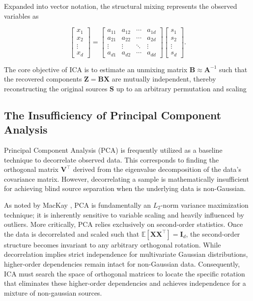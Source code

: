 \documentclass[12pt,a4paper,twoside,openany]{book}
\begin{document}
Expanded into vector notation, the structural mixing represents the observed variables as

\begin{equation}
    \begin{bmatrix}
    x_1 \\
    x_2 \\
    \vdots \\
    x_d
    \end{bmatrix}
    = 
    \begin{bmatrix}
    a_{11} & a_{12} & \cdots & a_{1d} \\
    a_{21} & a_{22} & \cdots & a_{2d} \\
    \vdots & \vdots & \ddots & \vdots \\
    a_{d1} & a_{d2} & \cdots & a_{dd}
    \end{bmatrix}
    \begin{bmatrix}
    s_1 \\
    s_2 \\
    \vdots \\
    s_d
    \end{bmatrix}.
\end{equation}

The core objective of ICA is to estimate an unmixing matrix $\mathbf{B} \approx \mathbf{A}^{-1}$ such that the recovered components $\mathbf{Z} = \mathbf{B}\mathbf{X}$ 
are mutually independent, thereby reconstructing the original sources $\mathbf{S}$ up to an arbitrary permutation and scaling

\subsection{The Insufficiency of Principal Component Analysis}

Principal Component Analysis (PCA) is frequently utilized as a baseline technique to decorrelate observed data. 
This corresponds to finding the orthogonal matrix $\mathbf{V}^\top$ derived from the eigenvalue decomposition of 
the data's covariance matrix. However, decorrelating a sample is mathematically insufficient for 
achieving blind source separation when the underlying data is non-Gaussian. 

As noted by MacKay \citeyear{mackay2003}, PCA is fundamentally an $L_2$-norm variance maximization technique; 
it is inherently sensitive to variable scaling and heavily influenced by outliers. More critically, 
PCA relies exclusively on second-order statistics. Once the data is decorrelated and scaled such that $\mathbb{E}[\mathbf{X}\mathbf{X}^\top] = \mathbf{I}_d$, 
the second-order structure becomes invariant to any arbitrary orthogonal rotation. 
While decorrelation implies strict independence for multivariate Gaussian distributions, 
higher-order dependencies remain intact for non-Gaussian data. Consequently, ICA must search the space of orthogonal matrices 
to locate the specific rotation that eliminates these higher-order dependencies and achieves independence for a mixture of non-gaussian sources.
\end{document}
